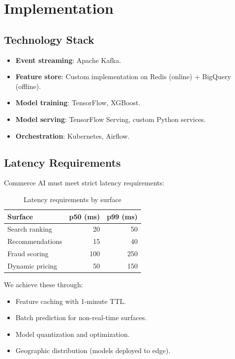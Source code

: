\section{Implementation}


\subsection{Technology Stack}

\begin{itemize}
\item \textbf{Event streaming}: Apache Kafka.
\item \textbf{Feature store}: Custom implementation on Redis (online) + BigQuery (offline).
\item \textbf{Model training}: TensorFlow, XGBoost.
\item \textbf{Model serving}: TensorFlow Serving, custom Python services.
\item \textbf{Orchestration}: Kubernetes, Airflow.
\end{itemize}

\subsection{Latency Requirements}

Commerce AI must meet strict latency requirements:

\begin{table}[h]
\centering
\caption{Latency requirements by surface}
\label{tab:latency}
\begin{tabular}{lrr}
\hline
Surface & p50 (ms) & p99 (ms) \\
\hline
Search ranking & 20 & 50 \\
Recommendations & 15 & 40 \\
Fraud scoring & 100 & 250 \\
Dynamic pricing & 50 & 150 \\
\hline
\end{tabular}
\end{table}

We achieve these through:
\begin{itemize}
\item Feature caching with 1-minute TTL.
\item Batch prediction for non-real-time surfaces.
\item Model quantization and optimization.
\item Geographic distribution (models deployed to edge).
\end{itemize}


